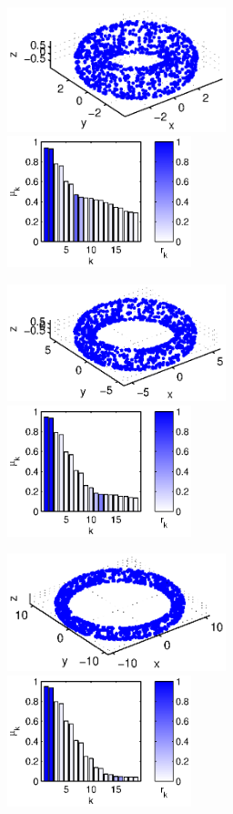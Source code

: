 \documentclass[preprint]{elsarticle}
\begin{document}
\begin{figure}[t]
%
\begin{subfigure}{\textwidth}
\includegraphics[width=2.5in]{torus1}
\includegraphics[height=1.5in]{torus1_evals}
\caption{}
\end{subfigure}
%
\begin{subfigure}{\textwidth}
\includegraphics[width=2.5in]{torus2}
\includegraphics[height=1.5in]{torus2_evals}\\
\caption{}
\end{subfigure}
%
\begin{subfigure}{\textwidth}
\includegraphics[width=2.5in]{torus3}
\includegraphics[height=1.5in]{torus3_evals}

\end{subfigure}
\end{figure}
\end{document}
